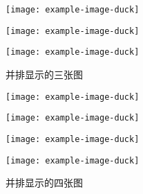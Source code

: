 \documentclass{QHUMaster}
\begin{document}
\lipsum[1]

\begin{figure}[htbp]
	\centering
	\begin{minipage}[b]{0.3\textwidth}
		\centering
		\texttt{[image: example-image-duck]}
		\label{fig:subfig1}
	\end{minipage}
	\hfill
	\begin{minipage}[b]{0.3\textwidth}
		\centering
		\texttt{[image: example-image-duck]}
		\label{fig:subfig2}
	\end{minipage}
	\hfill
	\begin{minipage}[b]{0.3\textwidth}
		\centering
		\texttt{[image: example-image-duck]}
		\label{fig:subfig3}
	\end{minipage}
	\caption{并排显示的三张图}
	\label{fig:main}
\end{figure}

\zhlipsum[1]

\begin{figure}[htbp]
	\centering
	\begin{minipage}[b]{0.45\textwidth}
		\centering
		\texttt{[image: example-image-duck]}
		\label{fig:subfig1}
	\end{minipage}
	\hfill
	\begin{minipage}[b]{0.45\textwidth}
		\centering
		\texttt{[image: example-image-duck]}
		\label{fig:subfig2}
	\end{minipage}
	\vspace{0.5cm}
	\begin{minipage}[b]{0.45\textwidth}
		\centering
		\texttt{[image: example-image-duck]}
		\label{fig:subfig3}
	\end{minipage}
	\hfill
	\begin{minipage}[b]{0.45\textwidth}
		\centering
		\texttt{[image: example-image-duck]}
		\label{fig:subfig4}
	\end{minipage}
	\caption{并排显示的四张图}
	\label{fig:main}
\end{figure}

\lipsum[1]
\end{document}
